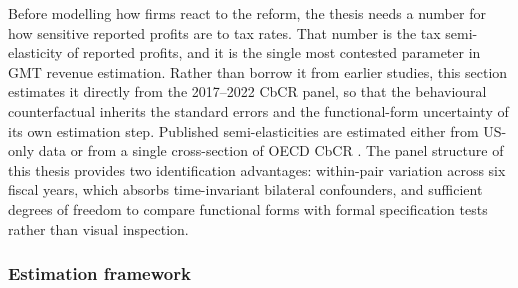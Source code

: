 \documentclass[11pt,a4paper]{article}
\begin{document}
Before modelling how firms react to the reform, the thesis needs a number for how sensitive reported profits are to tax rates. That number is the tax semi-elasticity of reported profits, and it is the single most contested parameter in GMT revenue estimation. Rather than borrow it from earlier studies, this section estimates it directly from the 2017--2022 CbCR panel, so that the behavioural counterfactual inherits the standard errors and the functional-form uncertainty of its own estimation step. Published semi-elasticities are estimated either from US-only data \citep{dowd2017} or from a single cross-section of OECD CbCR \citep{garcia-bernardo2024}. The panel structure of this thesis provides two identification advantages: within-pair variation across six fiscal years, which absorbs time-invariant bilateral confounders, and sufficient degrees of freedom to compare functional forms with formal specification tests rather than visual inspection.

\subsubsection{Estimation framework}\label{sec:hines_rice}
\end{document}

